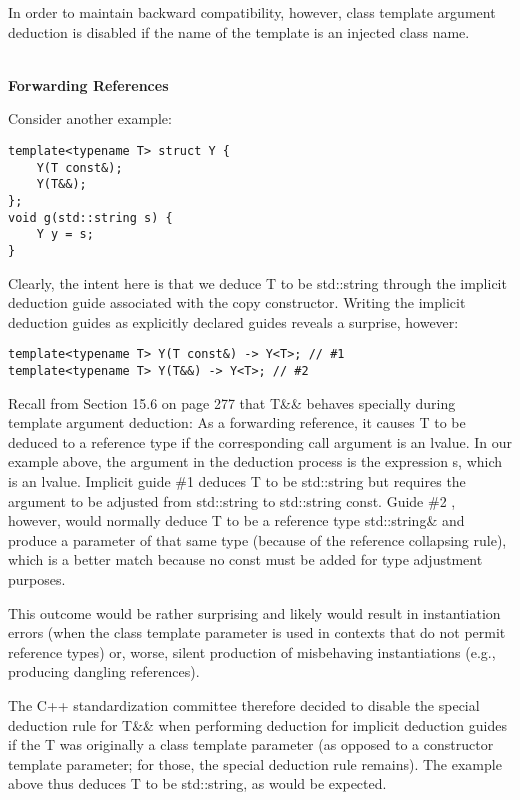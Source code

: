 In order to maintain backward compatibility, however, class template argument deduction is disabled if the name of the template is an injected class name.


\hspace*{\fill} \\ %
\noindent
\textbf{Forwarding References}

Consider another example:

\begin{lstlisting}[style=styleCXX]
template<typename T> struct Y {
	Y(T const&);
	Y(T&&);
};
void g(std::string s) {
	Y y = s;
}
\end{lstlisting}

Clearly, the intent here is that we deduce T to be std::string through the implicit deduction guide associated with the copy constructor. Writing the implicit deduction guides as explicitly declared guides reveals a surprise, however:

\begin{lstlisting}[style=styleCXX]
template<typename T> Y(T const&) -> Y<T>; // #1
template<typename T> Y(T&&) -> Y<T>; // #2
\end{lstlisting}

Recall from Section 15.6 on page 277 that T\&\& behaves specially during template argument deduction: As a forwarding reference, it causes T to be deduced to a reference type if the corresponding call argument is an lvalue. In our example above, the argument in the deduction process is the expression s, which is an lvalue. Implicit guide \#1 deduces T to be std::string but requires the argument to be adjusted from std::string to std::string const. Guide \#2 , however, would normally deduce T to be a reference type std::string\& and produce a parameter of that same type (because of the reference collapsing rule), which is a better match because no const must be added for type adjustment purposes.

This outcome would be rather surprising and likely would result in instantiation errors (when the class template parameter is used in contexts that do not permit reference types) or, worse, silent production of misbehaving instantiations (e.g., producing dangling references).

The C++ standardization committee therefore decided to disable the special deduction rule for T\&\& when performing deduction for implicit deduction guides if the T was originally a class template parameter (as opposed to a constructor template parameter; for those, the special deduction rule remains). The example above thus deduces T to be std::string, as would be expected.


